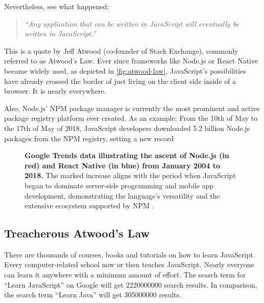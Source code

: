 \documentclass[10pt]{article}
\begin{document}
\begin{sloppypar}
  Nevertheless, see what happened:

  \begin{quote}
    \emph{“Any application that can be written in JavaScript will eventually be written in JavaScript.” \citep{atwood_principle_2007}}
  \end{quote}

  This is a quote by Jeff Atwood (co-founder of Stack Exchange), commonly referred to as Atwood’s Law. Ever since frameworks like Node.js or React Native became widely used, as depicted in \autoref{fig:atwood-law}, JavaScript’s possibilities have already crossed the border of just living on the client side inside of a browser. It is nearly everywhere.

  Also, Node.js’ NPM package manager is currently the most prominent and active package registry platform ever created. As an example: From the 10th of May to the 17th of May of 2018, JavaScript developers downloaded 5.2 billion Node.js packages from the NPM registry, setting a new record \citep{npm_how_2018}

  \begin{figure}[ht]
    \centering
    \caption[Google Trends data illustrating the ascent of Node.js and React Native.]{\textbf{Google Trends data illustrating the ascent of Node.js (in red) and React Native (in blue) from January 2004 to 2018.} The marked increase aligns with the period when JavaScript began to dominate server-side programming and mobile app development, demonstrating the language's versatility and the extensive ecosystem supported by NPM \citep{google_google_nodate}.}
    \label{fig:atwood-law}
  \end{figure}

  \subsection{Treacherous Atwood’s Law}
  \label{sec:atwood-law}

  There are thousands of courses, books and tutorials on how to learn JavaScript. Every computer-related school now or then teaches JavaScript. Nearly everyone can learn it anywhere with a minimum amount of effort. The search term for “Learn JavaScript” on Google will get \num{2220000000} search results. In comparison, the search term “Learn Java” will get \num{305000000} results.


\end{sloppypar}
\end{document}
